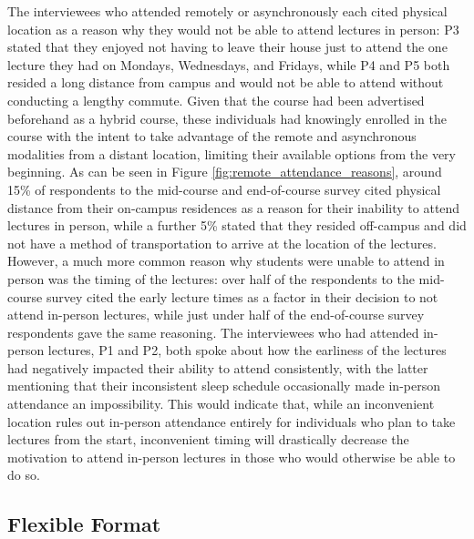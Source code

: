 The interviewees who attended remotely or asynchronously each cited physical location as a reason why they would not be able to attend lectures in person: P3 stated that they enjoyed not having to leave their house just to attend the one lecture they had on Mondays, Wednesdays, and Fridays, while P4 and P5 both resided a long distance from campus and would not be able to attend without conducting a lengthy commute. Given that the course had been advertised beforehand as a hybrid course, these individuals had knowingly enrolled in the course with the intent to take advantage of the remote and asynchronous modalities from a distant location, limiting their available options from the very beginning. As can be seen in Figure \ref{fig:remote_attendance_reasons}, around 15\% of respondents to the mid-course and end-of-course survey cited physical distance from their on-campus residences as a reason for their inability to attend lectures in person, while a further 5\% stated that they resided off-campus and did not have a method of transportation to arrive at the location of the lectures. However, a much more common reason why students were unable to attend in person was the timing of the lectures: over half of the respondents to the mid-course survey cited the early lecture times as a factor in their decision to not attend in-person lectures, while just under half of the end-of-course survey respondents gave the same reasoning. The interviewees who had attended in-person lectures, P1 and P2, both spoke about how the earliness of the lectures had negatively impacted their ability to attend consistently, with the latter mentioning that their inconsistent sleep schedule occasionally made in-person attendance an impossibility. This would indicate that, while an inconvenient location rules out in-person attendance entirely for individuals who plan to take lectures from the start, inconvenient timing will drastically decrease the motivation to attend in-person lectures in those who would otherwise be able to do so.

\subsection{Flexible Format}

